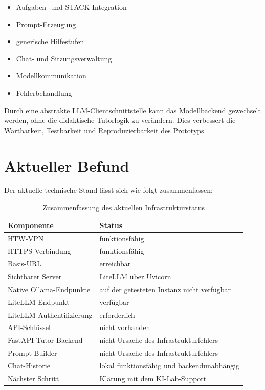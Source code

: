 \documentclass[11pt,a4paper,oneside,ngerman]{memoir}
\begin{document}
\begin{itemize}
    \item Aufgaben- und STACK-Integration
    \item Prompt-Erzeugung
    \item generische Hilfestufen
    \item Chat- und Sitzungsverwaltung
    \item Modellkommunikation
    \item Fehlerbehandlung
\end{itemize}

Durch eine abstrakte LLM-Clientschnittstelle kann das Modellbackend gewechselt werden, ohne die didaktische Tutorlogik zu verändern. Dies verbessert die Wartbarkeit, Testbarkeit und Reproduzierbarkeit des Prototyps.

\chapter{Aktueller Befund}

Der aktuelle technische Stand lässt sich wie folgt zusammenfassen:

\begin{table}[htbp]
\centering
\caption{Zusammenfassung des aktuellen Infrastrukturstatus}
\label{tab:current-status}
\small
\begin{tabularx}{\textwidth}{@{}p{}X@{}}
\toprule
\textbf{Komponente} & \textbf{Status} \\
\midrule
HTW-VPN & funktionsfähig \\
HTTPS-Verbindung & funktionsfähig \\
Basis-URL & erreichbar \\
Sichtbarer Server & LiteLLM über Uvicorn \\
Native Ollama-Endpunkte & auf der getesteten Instanz nicht verfügbar \\
LiteLLM-Endpunkt & verfügbar \\
LiteLLM-Authentifizierung & erforderlich \\
API-Schlüssel & nicht vorhanden \\
FastAPI-Tutor-Backend & nicht Ursache des Infrastrukturfehlers \\
Prompt-Builder & nicht Ursache des Infrastrukturfehlers \\
Chat-Historie & lokal funktionsfähig und backendunabhängig \\
Nächster Schritt & Klärung mit dem KI-Lab-Support \\
\bottomrule
\end{tabularx}
\end{table}
\end{document}
